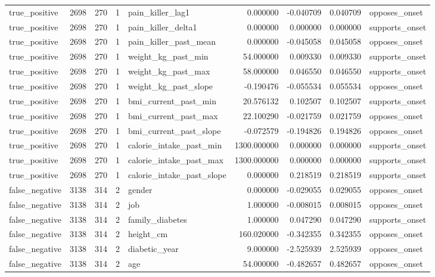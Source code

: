 \begin{longtable}{lrrrlrrrl}
true\_positive & 2698 & 270 & 1 & pain\_killer\_lag1 & 0.000000 & -0.040709 & 0.040709 & opposes\_onset \\
true\_positive & 2698 & 270 & 1 & pain\_killer\_delta1 & 0.000000 & 0.000000 & 0.000000 & supports\_onset \\
true\_positive & 2698 & 270 & 1 & pain\_killer\_past\_mean & 0.000000 & -0.045058 & 0.045058 & opposes\_onset \\
true\_positive & 2698 & 270 & 1 & weight\_kg\_past\_min & 54.000000 & 0.009330 & 0.009330 & supports\_onset \\
true\_positive & 2698 & 270 & 1 & weight\_kg\_past\_max & 58.000000 & 0.046550 & 0.046550 & supports\_onset \\
true\_positive & 2698 & 270 & 1 & weight\_kg\_past\_slope & -0.190476 & -0.055534 & 0.055534 & opposes\_onset \\
true\_positive & 2698 & 270 & 1 & bmi\_current\_past\_min & 20.576132 & 0.102507 & 0.102507 & supports\_onset \\
true\_positive & 2698 & 270 & 1 & bmi\_current\_past\_max & 22.100290 & -0.021759 & 0.021759 & opposes\_onset \\
true\_positive & 2698 & 270 & 1 & bmi\_current\_past\_slope & -0.072579 & -0.194826 & 0.194826 & opposes\_onset \\
true\_positive & 2698 & 270 & 1 & calorie\_intake\_past\_min & 1300.000000 & 0.000000 & 0.000000 & supports\_onset \\
true\_positive & 2698 & 270 & 1 & calorie\_intake\_past\_max & 1300.000000 & 0.000000 & 0.000000 & supports\_onset \\
true\_positive & 2698 & 270 & 1 & calorie\_intake\_past\_slope & 0.000000 & 0.218519 & 0.218519 & supports\_onset \\
false\_negative & 3138 & 314 & 2 & gender & 0.000000 & -0.029055 & 0.029055 & opposes\_onset \\
false\_negative & 3138 & 314 & 2 & job & 1.000000 & -0.008015 & 0.008015 & opposes\_onset \\
false\_negative & 3138 & 314 & 2 & family\_diabetes & 1.000000 & 0.047290 & 0.047290 & supports\_onset \\
false\_negative & 3138 & 314 & 2 & height\_cm & 160.020000 & -0.342355 & 0.342355 & opposes\_onset \\
false\_negative & 3138 & 314 & 2 & diabetic\_year & 9.000000 & -2.525939 & 2.525939 & opposes\_onset \\
false\_negative & 3138 & 314 & 2 & age & 54.000000 & -0.482657 & 0.482657 & opposes\_onset \\

\end{longtable}
